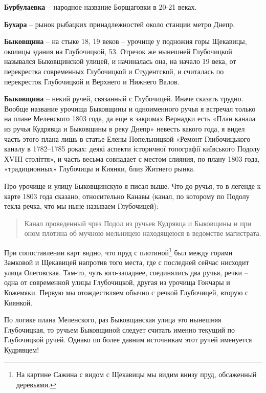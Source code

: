 \textbf{Бурбулаевка} – народное название Борщаговки в 20-21 веках.\\

\medskip


\textbf{Бухара} – рынок рыбацких принадлежностей около станции метро Днепр.\\

\medskip

\textbf{Быковщина} – на стыке 18, 19 веков – урочище у подножия горы Щекавицы, околицы здания на Глубочицкой, 53. Отрезок же нынешней Глубочицкой назывался Быковщинской улицей, и начиналась она, на начало 19 века, от перекрестка современных Глубочицкой и Студентской, и считалась по перекресток Глубочицкой и Верхнего и Нижнего Валов.\\

\medskip

\textbf{Быковщина} – некий ручей, связанный с Глубочицей. Иначе сказать трудно. Вообще название урочища Быковщины и одноименного ручья я встречал только на плане Меленского 1803 года, да еще в закромах Вернадки есть «План канала из ручья Кудрявца и Быковщины в реку Днепр» невесть какого года, я видел часть этого плана лишь в статье Елены Попельницкой «Ремонт Глибочицького каналу в 1782–1785 роках: деякі аспекти історичної топографії київського Подолу ХVIII століття», и часть весьма совпадает с местом слияния, по плану 1803 года, «традиционных» Глубочицы и Киянки, близ Житнего рынка.

Про урочище и улицу Быковщинскую я писал выше. Что до ручья, то в легенде к карте 1803 года сказано, относительно Канавы (канал, по которому по Подолу текла речка, что мы ныне называем Глубочицей):

\begin{quotation}
Канал проведенный чрез Подол из ручьев Кудрявца и Быковщины и при оном плотина об мучною мельницею находящеюся в ведомстве магистрата.
\end{quotation}

При сопоставлении карт видно, что пруд с плотиной\footnote{На картине Сажина с видом с Щекавицы мы видим внизу пруд, обсаженный деревьями.} был между горами Замковой и Щекавицей напротив того места, где с последней сейчас нисходит улица Олеговская. Там-то, чуть юго-западнее, соединялись два ручья, речки – одна от современной улицы Глубочицкой, другая из урочища Гончары и Кожемяки. Первую мы отождествляем обычно с речкой Глубочицей, вторую с Киянкой.

По логике плана Меленского, раз Быковщанская улица это нынешняя Глубочицкая, то ручьем Быковщиной следует считать именно текущий по Глубочицкой ручей. Однако по более давним источникам этот ручей именуется Кудрявцем!

